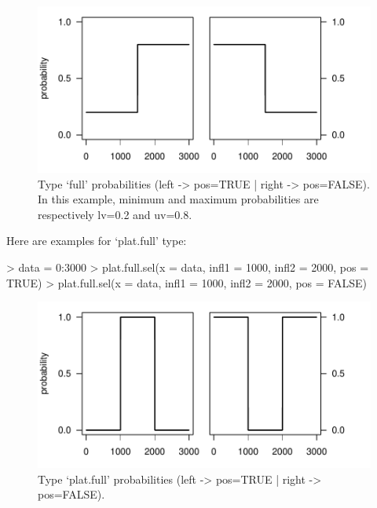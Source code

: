 \documentclass[letterpaper, 12pt]{article}
\begin{document}
\begin{figure}[h]
\vspace{-20pt}
\begin{center}
\includegraphics{relation_sel-007}
\end{center}
\vspace{-30pt}
\caption{Type `full' probabilities (left -> pos=TRUE |  right -> pos=FALSE). In this example, minimum and maximum probabilities are respectively lv=0.2 and uv=0.8.}
\vspace{-10pt}
\label{fig3}
\end{figure}

\newpage

Here are examples for `plat.full' type:
\begin{Schunk}
\begin{Sinput}
> data = 0:3000
> plat.full.sel(x = data, infl1 = 1000, infl2 = 2000, pos = TRUE)
> plat.full.sel(x = data, infl1 = 1000, infl2 = 2000, pos = FALSE)
\end{Sinput}
\end{Schunk}
\begin{figure}[h]
\vspace{-20pt}
\begin{center}
\includegraphics{relation_sel-009}
\end{center}
\vspace{-30pt}
\caption{Type `plat.full' probabilities (left -> pos=TRUE |  right -> pos=FALSE).}
\vspace{-10pt}
\label{fig4}
\end{figure}
\end{document}
